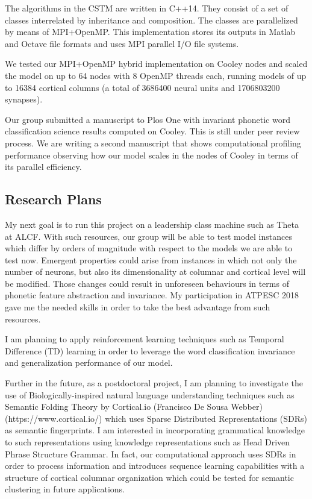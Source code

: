 \documentclass{article}
\begin{document}
The algorithms in the CSTM are written in C++14. They consist of a set of classes interrelated by inheritance and composition. The classes are parallelized by means of MPI+OpenMP. This implementation stores its outputs in Matlab and Octave file formats and uses MPI parallel I/O file systems.

We tested our MPI+OpenMP hybrid implementation on Cooley nodes and scaled the model on up to 64 nodes with 8 OpenMP threads each, running models of up to 16384 cortical columns (a total of 3686400 neural units and 1706803200 synapses).

Our group submitted a manuscript to Plos One with invariant phonetic word classification science results computed on Cooley. This is still under peer review process. We are writing a second manuscript that shows computational profiling performance observing how our model scales in the nodes of Cooley in terms of its parallel efficiency.


\subsection*{Research Plans}

My next goal is to run this project on a leadership class machine such as Theta at ALCF. With such resources, our group will be able to test model instances which differ by orders of magnitude with respect to the models we are able to test now. Emergent properties could arise from instances in which not only the number of neurons, but also its dimensionality at columnar and cortical level will be modified. Those changes could result in unforeseen behaviours in terms of phonetic feature abstraction and invariance. My participation in ATPESC 2018 gave me the needed skills in order to take the best advantage from such resources.

I am planning to apply reinforcement learning techniques such as Temporal Difference (TD) learning in order to leverage the word classification invariance and generalization performance of our model.

Further in the future, as a postdoctoral project, I am planning to investigate the use of Biologically-inspired natural language understanding techniques such as Semantic Folding Theory by Cortical.io (Francisco De Sousa Webber) (https://www.cortical.io/) which uses Sparse Distributed Representations (SDRs) as semantic fingerprints. I am interested in incorporating grammatical knowledge to such representations using knowledge representations such as Head Driven Phrase Structure Grammar. In fact, our computational approach uses SDRs in order to process information and introduces sequence learning capabilities with a structure of cortical columnar organization which could be tested for semantic clustering in future applications.
\end{document}
